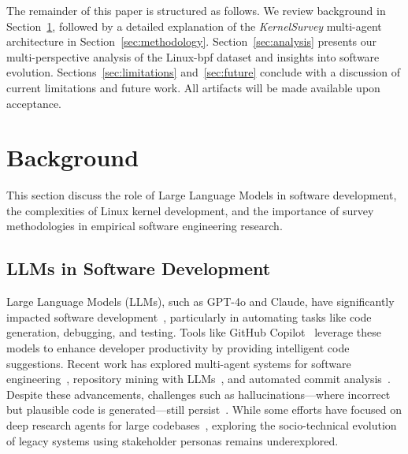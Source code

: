 \documentclass[sigconf,review,anonymous]{acmart}
\newcommand{\sys}{\textit{KernelSurvey}\xspace}
\begin{document}
The remainder of this paper is structured as follows. We review background in Section~\ref{sec:related}, followed by a detailed explanation of the \sys multi-agent architecture in Section~\ref{sec:methodology}. Section~\ref{sec:analysis} presents our multi-perspective analysis of the Linux-bpf dataset and insights into software evolution. Sections~\ref{sec:limitations} and~\ref{sec:future} conclude with a discussion of current limitations and future work. All artifacts will be made available upon acceptance.

\section{Background}
\label{sec:related}

This section discuss the role of Large Language Models in software development, the complexities of Linux kernel development, and the importance of survey methodologies in empirical software engineering research.

\subsection{LLMs in Software Development}

Large Language Models (LLMs), such as GPT-4o and Claude, have significantly impacted software development~\cite{jin2024llms}, particularly in automating tasks like code generation, debugging, and testing. Tools like GitHub Copilot~\cite{copilot} leverage these models to enhance developer productivity by providing intelligent code suggestions. Recent work has explored multi-agent systems for software engineering~\cite{lmase2024,agent4se2024}, repository mining with LLMs~\cite{primes2024}, and automated commit analysis~\cite{commitgen2024,apce2025}. Despite these advancements, challenges such as hallucinations—where incorrect but plausible code is generated—still persist~\cite{fan2023large,ji2023survey}. While some efforts have focused on deep research agents for large codebases~\cite{coderesearcher2025}, exploring the socio-technical evolution of legacy systems using stakeholder personas remains underexplored.
\end{document}
